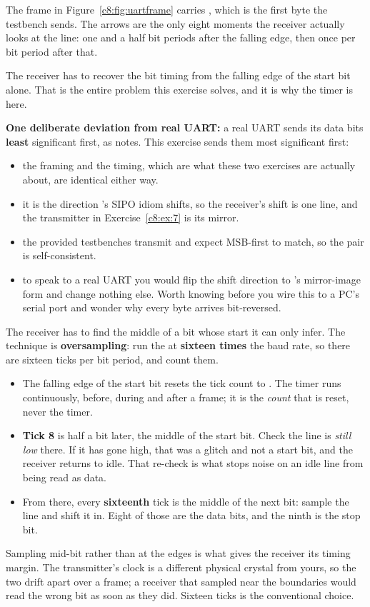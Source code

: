 \noindent The frame in Figure~\ref{c8:fig:uartframe} carries , which is the first
byte the testbench sends. The arrows are the only eight moments the receiver actually looks at the
line: one and a half bit periods after the falling edge, then once per bit period after that.

The receiver has to recover the bit timing from the falling edge of the start bit alone. That is
the entire problem this exercise solves, and it is why the timer is here.

\textbf{One deliberate deviation from real UART:} a real UART sends its data bits \textbf{least}
significant first, as  notes. This exercise sends them most significant first:
\begin{itemize}
  \item the framing and the timing, which are what these two exercises are actually about, are
    identical either way.
  \item it is the direction 's SIPO idiom shifts, so the receiver's shift is one line,
    and the transmitter in Exercise~\ref{c8:ex:7} is its mirror.
  \item the provided testbenches transmit and expect MSB-first to match, so the pair is
    self-consistent.
  \item to speak to a real UART you would flip the shift direction to 's mirror-image
    form and change nothing else. Worth knowing before you wire this to a PC's serial port and
    wonder why every byte arrives bit-reversed.
\end{itemize}

The receiver has to find the middle of a bit whose start it can only infer. The technique is
\textbf{oversampling}: run the  at \textbf{sixteen times} the baud rate, so there are
sixteen ticks per bit period, and count them.
\begin{itemize}
  \item The falling edge of the start bit resets the tick count to . The timer runs
    continuously, before, during and after a frame; it is the \emph{count} that is reset, never the
    timer.
  \item \textbf{Tick 8} is half a bit later, the middle of the start bit. Check the line is
    \emph{still low} there. If it has gone high, that was a glitch and not a start bit, and the
    receiver returns to idle. That re-check is what stops noise on an idle line from being read as
    data.
  \item From there, every \textbf{sixteenth} tick is the middle of the next bit: sample the line and
    shift it in. Eight of those are the data bits, and the ninth is the stop bit.
\end{itemize}
Sampling mid-bit rather than at the edges is what gives the receiver its timing margin. The
transmitter's clock is a different physical crystal from yours, so the two drift apart over a frame;
a receiver that sampled near the boundaries would read the wrong bit as soon as they did. Sixteen
ticks is the conventional choice.

